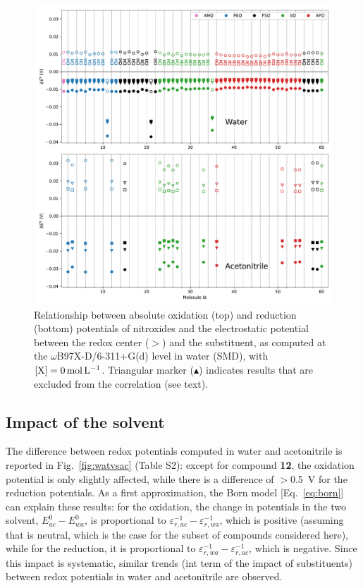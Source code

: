 \documentclass[review]{elsarticle}
\begin{document}
\begin{figure}[!h]
\centering
\includegraphics[width=\linewidth]{Figure8}
\caption{Relationship between absolute oxidation (top) and reduction (bottom) potentials of nitroxides and the electrostatic potential between the redox center ($>$) and the substituent, as computed at the $\omega$B97X-D/6-311+G(d) level in water (SMD), with $[\ce{X}]=\SI{0}{\mole\per\liter}$. Triangular marker ($\blacktriangle$) indicates results that are excluded from the correlation (see text).}
\label{fig:corr} 
\end{figure}

\clearpage

\subsection{Impact of the solvent}

The difference between redox potentials computed in water and acetonitrile is reported in Fig.~\ref{fig:watvsac} (Table S2): except for compound \textbf{12}, the oxidation potential is only slightly affected, while there is a difference of $>$\SI{0.5}{\volt} for the reduction potentials. As a first approximation, the Born model [Eq.~\eqref{eq:born}] can explain these results: for the oxidation, the change in potentials in the two solvent, $E^0_{ac} - E^0_{wa}$, is proportional to $ \varepsilon_{r,ac}^{-1}-\varepsilon_{r,wa}^{-1}$, which is positive (assuming that  is neutral, which is the case for the subset of compounds considered here), while for the reduction, it is proportional to $ \varepsilon_{r,wa}^{-1}-\varepsilon_{r,ac}^{-1}$, which is negative.  Since this impact is systematic, similar trends (int term of the impact of substituents) between redox potentials in water and acetonitrile are observed.
\end{document}
